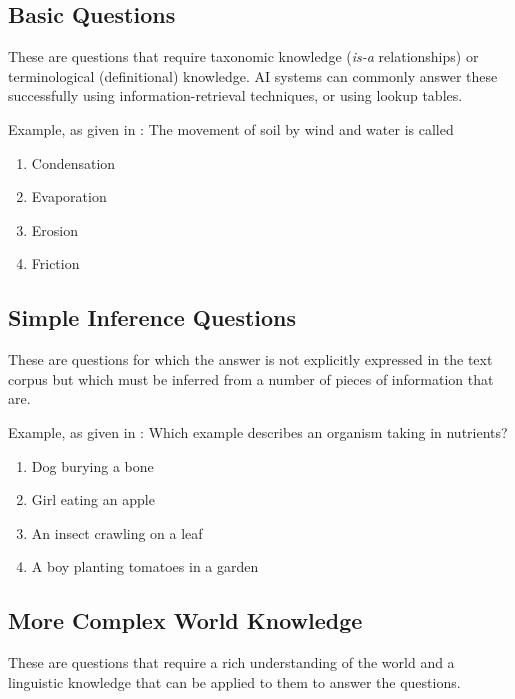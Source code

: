 \subsection{Basic Questions}

These are questions that require taxonomic knowledge (\textit{is-a} relationships) or terminological (definitional) knowledge.  AI systems can commonly answer these successfully using information-retrieval techniques, or using lookup tables.  


Example, as given in \cite{clark2015elementary}: The movement of soil by wind and water is called 

\begin{enumerate}[label=\Alph*.]
\item Condensation
\item Evaporation
\item Erosion
\item Friction
\end{enumerate}

\subsection{Simple Inference Questions}
These are questions for which the answer is not explicitly expressed in the text corpus but which must be inferred from a number of pieces of information that are.

Example, as given in \cite{clark2015elementary}: Which example describes an organism taking in nutrients? 

\begin{enumerate}[label=\Alph*.]
\item Dog burying a bone
\item Girl eating an apple
\item An insect crawling on a leaf
\item A boy planting tomatoes in a garden
\end{enumerate}


\subsection{More Complex World Knowledge}

These are questions that require a rich understanding of the world and a linguistic knowledge that can be applied to them to answer the questions.

